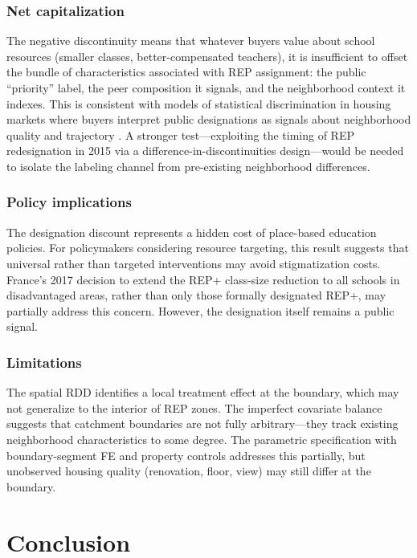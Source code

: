 \documentclass[12pt]{article}
\begin{document}
\subsubsection*{Net capitalization} The negative discontinuity means that whatever buyers value about school resources (smaller classes, better-compensated teachers), it is insufficient to offset the bundle of characteristics associated with REP assignment: the public ``priority'' label, the peer composition it signals, and the neighborhood context it indexes. This is consistent with models of statistical discrimination in housing markets where buyers interpret public designations as signals about neighborhood quality and trajectory \citep{rosen1974, tiebout1956}. A stronger test---exploiting the timing of REP redesignation in 2015 via a difference-in-discontinuities design---would be needed to isolate the labeling channel from pre-existing neighborhood differences.

\subsubsection*{Policy implications} The designation discount represents a hidden cost of place-based education policies. For policymakers considering resource targeting, this result suggests that universal rather than targeted interventions may avoid stigmatization costs. France's 2017 decision to extend the REP+ class-size reduction to all schools in disadvantaged areas, rather than only those formally designated REP+, may partially address this concern. However, the designation itself remains a public signal.

\subsubsection*{Limitations} The spatial RDD identifies a local treatment effect at the boundary, which may not generalize to the interior of REP zones. The imperfect covariate balance suggests that catchment boundaries are not fully arbitrary---they track existing neighborhood characteristics to some degree. The parametric specification with boundary-segment FE and property controls addresses this partially, but unobserved housing quality (renovation, floor, view) may still differ at the boundary.


\section{Conclusion}
\end{document}
